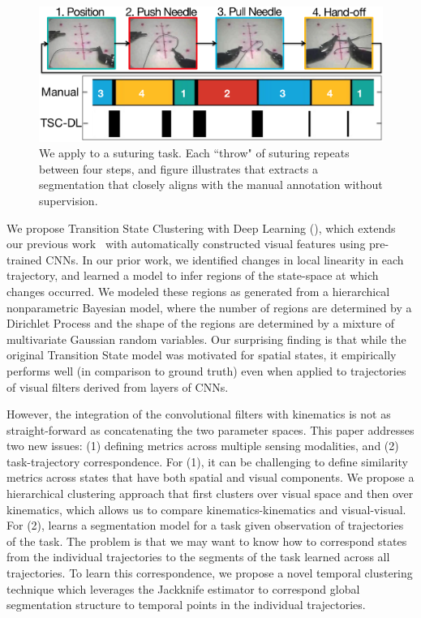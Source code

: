 \documentclass[0-main.tex]{subfiles}
\begin{document}
\begin{figure}[t!]
\centering
\vspace{-5pt}
\includegraphics[width=\linewidth]{figures/suturing-teaser-v4.png}
\caption{We apply \tsc to a suturing task. Each ``throw" of suturing repeats between four steps, and figure illustrates that \tsc extracts a segmentation that closely aligns with the manual annotation without supervision.}
\vspace{-15pt} 
\end{figure}
We propose Transition State Clustering with Deep Learning (\tsc), which extends our previous work~\cite{krishnan2015tsc} with automatically constructed visual features using pre-trained CNNs.
In our prior work, we identified changes in local linearity in each trajectory, and learned a model to infer regions of the state-space at which changes occurred.
We modeled these regions as generated from a hierarchical nonparametric Bayesian model, where the number of regions are determined by a Dirichlet Process and the shape of the regions are determined by a mixture of multivariate Gaussian random variables.
Our surprising finding is that while the original Transition State model was motivated for spatial states, it empirically performs well (in comparison to ground truth) even when applied to trajectories of visual filters derived from layers of CNNs.

However, the integration of the convolutional filters with kinematics is not as straight-forward as concatenating the two parameter spaces.
This paper addresses two new issues: (1) defining metrics across multiple sensing modalities, and (2) task-trajectory correspondence.
For (1), it can be challenging to define similarity metrics across states that have both spatial and visual components.
We propose a hierarchical clustering approach that first clusters over visual space and then over kinematics, which allows us to compare kinematics-kinematics and visual-visual.  
For (2), \tsc learns a segmentation model for a task given observation of trajectories of the task.
The problem is that we may want to know how to correspond states from the individual trajectories to the segments of the task learned across all trajectories.
To learn this correspondence, we propose a novel temporal clustering technique which leverages the Jackknife estimator to correspond global segmentation structure to temporal points in the individual trajectories.
\end{document}
